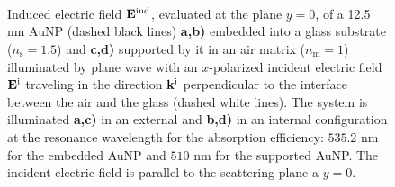  \begin{figure}[h!]\centering
 	\def\svgwidth{.85\textwidth}
    \small
    \\[-33.75em]
 	\hspace*{-.35\textwidth}
        \begin{subfigure}{.35\textwidth}\textcolor{red}{\caption{ } \label{sfig:Near:EE}}\end{subfigure}%
     	\begin{subfigure}{.34\textwidth}\caption{ }\label{sfig:Near:EI}\end{subfigure}\\[13.75em]
    \hspace*{-.34\textwidth}
        \begin{subfigure}{.35\textwidth}\caption{ } \label{sfig:Near:SE}\end{subfigure}%
        \begin{subfigure}{.34\textwidth}\caption{ }\label{sfig:Near:SI}\end{subfigure}\\[16em]
 	\caption[Induced Electric Field of a 12.5 nm Au Spherical NP embbeded into (supported by) a substrate illuminated at a normal incidence]{Induced electric field $\vb{E}^\text{ind}$, evaluated at the plane $y = 0$, of a 12.5 nm AuNP (dashed black lines) \textbf{a,b)} embedded into a glass substrate ($n_\text{s} = 1.5$) and \textbf{c,d)} supported by it in an air matrix ($n_\text{m} = 1$) illuminated by plane wave with an $x$-polarized incident electric field $\vb{E}^\text{i}$ traveling in the direction $\vb{k}^\text{i}$ perpendicular to the interface between the air and the glass (dashed white lines). The system is illuminated \textbf{a,c)}  in an external and \textbf{b,d)} in an internal configuration at the resonance  wavelength for the absorption efficiency: $535.2$ nm for the embedded AuNP and $510$ nm for the supported AuNP. The incident electric field is parallel to the scattering plane a $y=0$.
    }
 	\label{fig:Near:IntExt}
  \end{figure}
